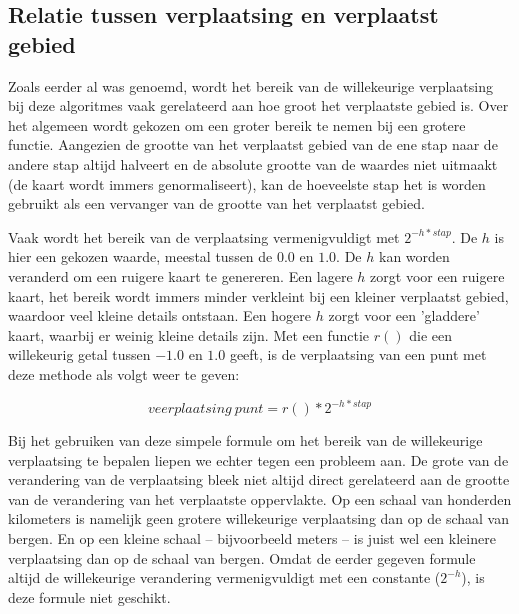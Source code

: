 \documentclass{article}
\begin{document}
\subsection{Relatie tussen verplaatsing en verplaatst gebied}

Zoals eerder al was genoemd, wordt het bereik van de willekeurige verplaatsing bij deze algoritmes vaak gerelateerd aan hoe groot het verplaatste gebied is. Over het algemeen wordt gekozen om een groter bereik te nemen bij een grotere functie. Aangezien de grootte van het verplaatst gebied van de ene stap naar de andere stap altijd halveert en de absolute grootte van de waardes niet uitmaakt (de kaart wordt immers genormaliseert), kan de hoeveelste stap het is worden gebruikt als een vervanger van de grootte van het verplaatst gebied. 

Vaak wordt het bereik van de verplaatsing vermenigvuldigt met $2^{-h*stap}$. De $h$ is hier een gekozen waarde, meestal tussen de $0.0$ en $1.0$. De $h$ kan worden veranderd om een ruigere kaart te genereren. Een lagere $h$ zorgt voor een ruigere kaart, het bereik wordt immers minder verkleint bij een kleiner verplaatst gebied, waardoor veel kleine details ontstaan. Een hogere $h$ zorgt voor een 'gladdere' kaart, waarbij er weinig kleine details zijn. Met een functie $r()$ die een willekeurig getal tussen $-1.0$ en $1.0$ geeft, is de verplaatsing van een punt met deze methode als volgt weer te geven:

\begin{equation}
  veerplaatsing~punt=r()*2^{-h*stap}
\end{equation}

Bij het gebruiken van deze simpele formule om het bereik van de willekeurige verplaatsing te bepalen liepen we echter tegen een probleem aan. De grote van de verandering van de verplaatsing bleek niet altijd direct gerelateerd aan de grootte van de verandering van het verplaatste oppervlakte. Op een schaal van honderden kilometers is namelijk geen grotere willekeurige verplaatsing dan op de schaal van bergen. En op een kleine schaal – bijvoorbeeld meters – is juist wel een kleinere verplaatsing dan op de schaal van bergen. Omdat de eerder gegeven formule altijd de willekeurige verandering vermenigvuldigt met een constante ($2^{-h}$), is deze formule niet geschikt.
\end{document}
